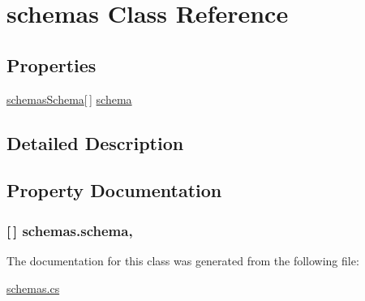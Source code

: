 \hypertarget{classschemas}{}\section{schemas Class Reference}
\label{classschemas}


 


\subsection*{Properties}
\begin{DoxyCompactItemize}
\item 
\hyperlink{classschemas_schema}{schemas\+Schema}\mbox{[}$\,$\mbox{]} \hyperlink{classschemas_adf132f5b1f6ac5984256a262fac2bb1b}{schema}
\end{DoxyCompactItemize}


\subsection{Detailed Description}


\subsection{Property Documentation}
\subsubsection[{\texorpdfstring{schema}{schema}}]{ \mbox{[}$\,$\mbox{]} schemas.\+schema\hspace{0.3cm}{\ttfamily [get]}, {\ttfamily [set]}}\hypertarget{classschemas_adf132f5b1f6ac5984256a262fac2bb1b}{}\label{classschemas_adf132f5b1f6ac5984256a262fac2bb1b}






The documentation for this class was generated from the following file\+:\begin{DoxyCompactItemize}
\item 
\hyperlink{schemas_8cs}{schemas.\+cs}\end{DoxyCompactItemize}
